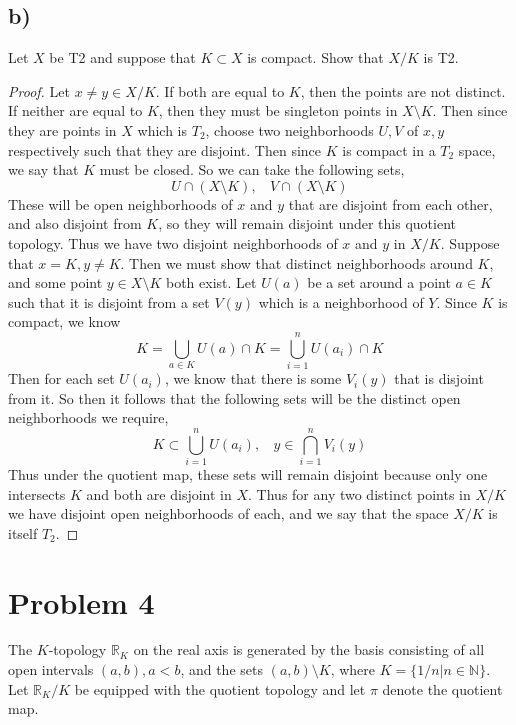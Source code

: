 \documentclass{article}
\theoremstyle{definition}
\begin{document}
\subsection*{b)}
\begin{mdframed}
    Let $X$ be T2 and suppose that $K \subset X$ is compact. Show that $X / K$ is T2.
\end{mdframed}
\begin{proof}
    Let $x \neq y \in X / K$. If both are equal to $K$, then the points are not distinct. If neither are 
    equal to $K$, then they must be singleton points in $X \setminus K$. Then since they are points in $X$ which is $T_2$,
    choose two neighborhoods $U,V$ of $x,y$ respectively such that they are disjoint. Then since $K$ is compact in a $T_2$ space,
    we say that $K$ must be closed. So we can take the following sets,
    \[
        U \cap (X \setminus K), \ \ \ \ V \cap (X \setminus K)
    \]
    These will be open neighborhoods of $x$ and $y$ that are disjoint from each other, and also disjoint from $K$, so they will remain disjoint
    under this quotient topology. Thus we have two disjoint neighborhoods of $x$ and $y$ in $X / K$. Suppose that $x = K, y \neq K$.
    Then we must show that distinct neighborhoods around $K$, and some point $y \in X \setminus K$ both exist. Let $U(a)$ be a set around a point $a \in K$ such that
    it is disjoint from a set $V(y)$ which is a neighborhood of $Y$. Since $K$ is compact, we know 
    \[
        K = \bigcup_{a \in K}U(a) \cap K = \bigcup_{i = 1}^n U(a_i) \cap K
    \]
    Then for each set $U(a_i)$, we know that there is some $V_i(y)$ that is disjoint from it. So then it follows that the following sets will be the distinct open neighborhoods we require,
    \[
        K \subset \bigcup_{i=1}^n U(a_i), \ \ \ \ y \in \bigcap_{i=1}^n V_i(y)
    \]
    Thus under the quotient map, these sets will remain disjoint because only one intersects $K$ and both are disjoint in $X$. Thus for any two distinct points 
    in $X/K$ we have disjoint open neighborhoods of each, and we say that the space $X / K$ is itself $T_2$.
\end{proof}
\section*{Problem 4}
The $K$-topology $\mathbb{R}_K$ on the real axis is generated by the basis consisting of all open
intervals $(a,b), a < b$, and the sets $(a,b) \setminus K$, where $K = \{1 / n | n \in \mathbb{N}\}$.
Let $\mathbb{R}_K / K$ be equipped with the quotient topology and let $\pi$ denote the quotient map.
\end{document}
